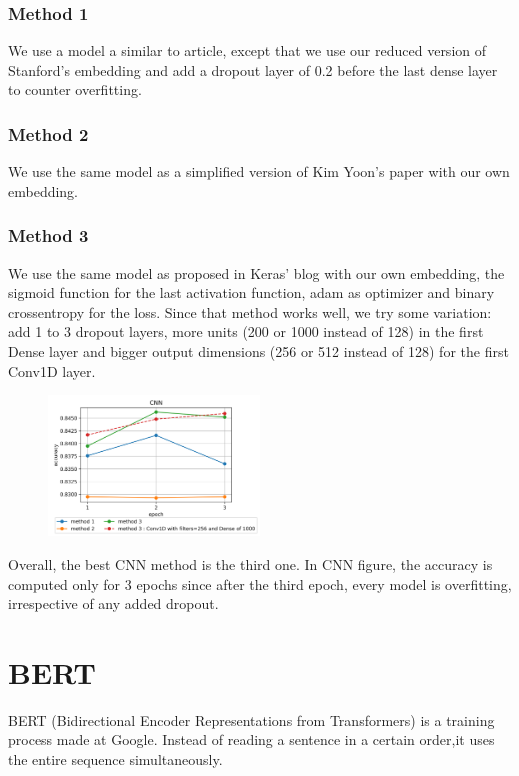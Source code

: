 \documentclass[11pt, a4paper, twocolumn]{article}
\begin{document}
\subsubsection{Method 1}
We use a model a similar to article\cite{cnn1}, except that we use our reduced version of Stanford's embedding and add a dropout layer of 0.2 before the last dense layer to counter overfitting.

\subsubsection{Method 2}
We use the same model as a simplified version\cite{cnn2} of Kim Yoon's paper\cite{kimyoonpaper} with our own embedding.

\subsubsection{Method 3}
We use the same model as proposed in Keras' blog\cite{cnn3} with our own embedding, the sigmoid function for the last activation function, adam as optimizer and binary crossentropy for the loss.
Since that method works well, we try some variation: add 1 to 3 dropout layers, more units (200 or 1000 instead of 128) in the first Dense layer and bigger output dimensions (256 or 512 instead of 128) for the first Conv1D layer. 

\begin{figure}[h]
	\centering
	\includegraphics[width=0.5\textwidth]{../plots/cnn.png}
\end{figure}

Overall, the best CNN method is the third one. In CNN figure, the accuracy is computed only for 3 epochs since after the third epoch, every model is overfitting, irrespective of any added dropout.

\section{BERT}
BERT (Bidirectional Encoder Representations from Transformers)\cite{bertpaper} is a training process made at Google. Instead of reading a sentence in a certain order,it uses the entire sequence simultaneously.
\end{document}
